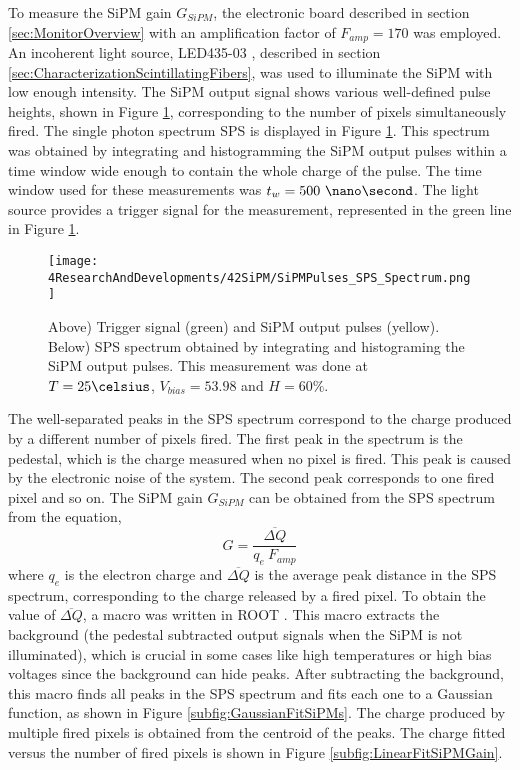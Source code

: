To measure the SiPM gain $G_{SiPM}$, the electronic board described in section \ref{sec:MonitorOverview} with an amplification factor of $F_{amp}=170$ was employed. An incoherent light source, LED435-03 \cite{LEDRLT}, described in section \ref{sec:CharacterizationScintillatingFibers}, was used to illuminate the SiPM with low enough intensity. The SiPM output signal shows various well-defined pulse heights, shown in Figure \ref{fig:OutputPulses_SPSspectrum}, corresponding to the number of pixels simultaneously fired. The single photon spectrum SPS is displayed in Figure \ref{fig:OutputPulses_SPSspectrum}. This spectrum was obtained by integrating and histogramming the SiPM output pulses within a time window wide enough to contain the whole charge of the pulse. The time window used for these measurements was $t_w= 500~\nano\second$. The light source provides a trigger signal for the measurement, represented in the green line in Figure \ref{fig:OutputPulses_SPSspectrum}.
\begin{figure}[hbtp]
\centering
\texttt{[image: 4ResearchAndDevelopments/42SiPM/SiPMPulses\_SPS\_Spectrum.png]}
\caption{Above) Trigger signal (green) and SiPM output pulses (yellow). Below) SPS spectrum obtained by integrating and histograming the SiPM output pulses. This measurement was done at $T=25\celsius$, $V_{bias}=53.98$ and $H=60\%$. \label{fig:OutputPulses_SPSspectrum}}
\end{figure}
The well-separated peaks in the SPS spectrum correspond to the charge produced by a different number of pixels fired. The first peak in the spectrum is the pedestal, which is the charge measured when no pixel is fired. This peak is caused by the electronic noise of the system. The second peak corresponds to one fired pixel and so on. The SiPM gain $G_{SiPM}$ can be obtained from the SPS spectrum from the equation,
\begin{equation}
G=\frac{\overline{\Delta Q}}{q_e \: F_{amp}}
\label{SiPMGain}
\end{equation}
where $q_e$ is the electron charge and $\overline{\Delta Q}$ is the average peak distance in the SPS spectrum, corresponding to the charge released by a fired pixel. To obtain the value of $\overline{\Delta Q}$, a macro was written in ROOT \cite{ROOTWebPage, ROOTWebPage2}. This macro extracts the background (the pedestal subtracted output signals when the SiPM is not illuminated), which is crucial in some cases like high temperatures or high bias voltages since the background can hide peaks. After subtracting the background, this macro finds all peaks in the SPS spectrum and fits each one to a Gaussian function, as shown in Figure \ref{subfig:GaussianFitSiPMs}. The charge produced by multiple fired pixels is obtained from the centroid of the peaks. The charge fitted versus the number of fired pixels is shown in Figure \ref{subfig:LinearFitSiPMGain}.

